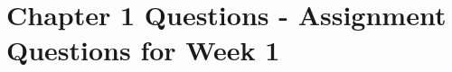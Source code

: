 \documentclass{article}
\begin{document}
\section*{Chapter 1 Questions - Assignment Questions for Week 1}


\end{document}
